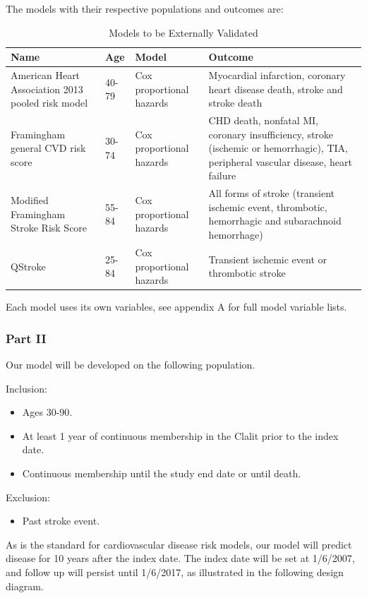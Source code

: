 \documentclass[a4paper,12pt]{article}
\begin{document}
		The models with their respective populations and outcomes are:
		\begin{table}[H]
		\begin{tabular}{|p{4cm}|p{1cm}|p{3cm}|p{4cm}|}
			\hline
			Name & Age & Model & Outcome \\
			\hline
			American Heart Association 2013 pooled risk model\cite{Goff2014} & 40-79 & Cox proportional hazards & Myocardial infarction, coronary heart disease death, stroke and stroke death \\
			\hline
			Framingham general CVD risk score\cite{DAgostino2008} & 30-74 & Cox proportional hazards & CHD death, nonfatal MI, coronary insufficiency, stroke (ischemic or hemorrhagic), TIA, peripheral vascular disease, heart failure \\
			\hline
			Modified Framingham Stroke Risk Score\cite{Wolf1991,DAgostino1994} & 55-84 & Cox proportional hazards & All forms of stroke (transient ischemic event, thrombotic, hemorrhagic and subarachnoid hemorrhage) \\
			\hline
			QStroke\cite{Hippisley-Cox2013} & 25-84 & Cox proportional hazards & Transient ischemic event or thrombotic stroke \\
			\hline
		\end{tabular}
		\caption{Models to be Externally Validated}
		\end{table}
	
		Each model uses its own variables, see appendix A for full model variable lists.
		
		\subsubsection{Part II}
		Our model will be developed on the following population.
		
		Inclusion:
		\begin{itemize}
			\item Ages 30-90.
			\item At least 1 year of continuous membership in the Clalit prior to the index date.
			\item Continuous membership until the study end date or until death.
		\end{itemize}
		Exclusion:
		\begin{itemize}
			\item Past stroke event.
		\end{itemize}
	
		As is the standard for cardiovascular disease risk models, our model will predict disease for 10 years after the index date. The index date will be set at 1/6/2007, and follow up will persist until 1/6/2017, as illustrated in the following design diagram.
		
\end{document}
